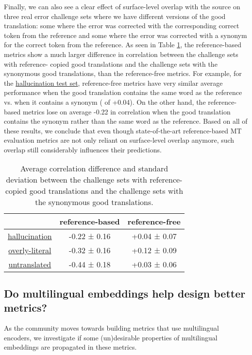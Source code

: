 \documentclass[11pt]{article}
\begin{document}
Finally, we can also see a clear effect of surface-level overlap with the source on three real error challenge sets where we have different versions of the good translation: some where the error was corrected with the corresponding correct token from the reference and some where the error was corrected with a synonym for the correct token from the reference. As seen in Table \ref{tab:my_label}, the reference-based metrics show a much larger difference in correlation between the challenge sets with reference- copied good translations and the challenge sets with the synonymous good translations, than the reference-free metrics. For example, for the \hyperref[subsec:real_hallucination]{hallucination test set}, reference-free metrics have very similar average performance when the good translation contains the same word as the reference vs. when it contains a synonym ( of +0.04). On the other hand, the reference-based metrics lose on average -0.22 in correlation when the good translation contains the synonym rather than the same word as the reference. Based on all of these results, we conclude that even though state-of-the-art reference-based MT evaluation metrics are not only reliant on surface-level overlap anymore, such overlap still considerably influences their predictions.

\begin{table}[]
    \centering
    \small
    \begin{tabular}{ccc}
    \toprule
         & reference-based & reference-free \\
        \midrule
        \hyperref[subsec:real_hallucination]{hallucination} & -0.22 ± 0.16 & +0.04 ± 0.07 \\
        \hyperref[subsec:real_overly_literal]{overly-literal} & -0.32 ± 0.16
        & +0.12 ± 0.09\\
        \hyperref[subsec:real_untranslated]{untranslated} & -0.44 ± 0.18 & +0.03 ± 0.06\\
    \bottomrule
    \end{tabular}
    \caption{Average correlation difference and standard deviation between the challenge sets with reference-copied good translations and the challenge sets with the synonymous good translations.}
    \label{tab:my_label}
\end{table}

\subsection{Do multilingual embeddings help design better metrics?}
\label{subsec:mutlilingual embeddings}
As the community moves towards building metrics that use multilingual encoders, we investigate if some (un)desirable properties of multilingual embeddings are propagated in these metrics. 
\end{document}
